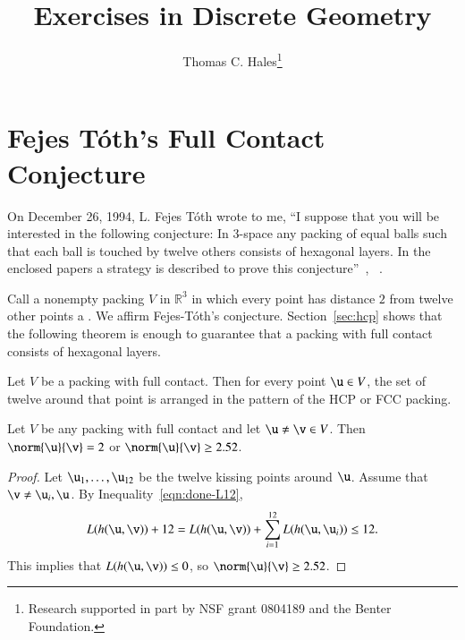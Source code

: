 \documentclass{llncs}
\newcommand{\ring}[1]{\mathbb{#1}}
\begin{document}
\title{Exercises in Discrete Geometry}
\author{Thomas C. Hales\thanks{{Research supported in part by 
NSF grant 0804189 and the Benter Foundation.}}}
\maketitle


\section{Fejes T\'oth's Full Contact Conjecture}


On December 26, 1994, L. Fejes T\'oth wrote to me, ``I suppose that you will
be interested in the following conjecture: In $3$-space any packing of
equal balls such that each ball is touched by twelve others consists
of hexagonal layers.  In the enclosed papers a strategy is described
to prove this conjecture''~\cite{Fejes-Toth:89},
~\cite{Fejes-Toth:69}.

Call a nonempty packing $V$ in $\ring{R}^3$ in which every point has
distance $2$ from twelve other points a .  We affirm Fejes-T\'oth's conjecture.  
Section~\ref{sec:hcp} shows that the following theorem
is enough to guarantee that a packing with full contact consists of
hexagonal layers.  
%
%


\begin{theorem}\label{thm:fc} 
  Let $V$ be a packing with full contact.  Then for every point $\u\in
  V$, the set of twelve around that point is arranged in the pattern
  of the HCP or FCC packing.
\end{theorem}
%
%
%



\begin{lemma}[] \label{lemma:gap}
  Let $V$ be any packing with full contact and let $\u\ne\v\in V$.
  Then $\norm{\u}{\v}=2$ or $\norm{\u}{\v} \ge 2.52$.
\end{lemma}
%
%

\begin{proof} Let $ \u_1,\ldots, \u_{12}$ be the twelve kissing points
  around $\u$.  Assume that $\v\ne \u_i,\u$.  By
  Inequality~\ref{eqn:done-L12},
\[
   L(h( \u, \v))  + 12 
  =  L(h( \u, \v)) + \sum_{i=1}^{12} L(h( \u, \u_i))  \le 12.
\]
This implies that $L(h( \u, \v))\le 0$, so $\norm{ \u}{ \v}\ge 2.52$.
\end{proof}
\end{document}
